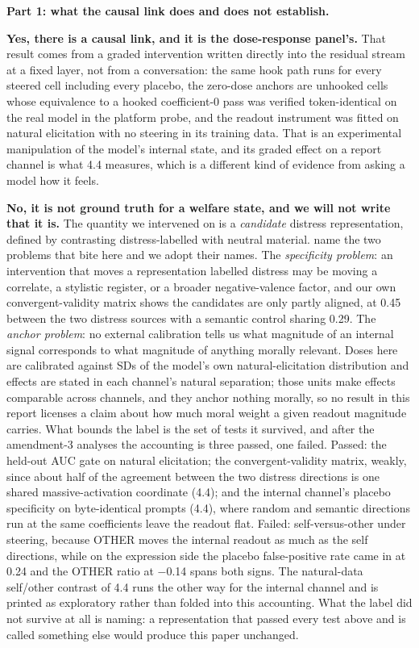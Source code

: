 \documentclass[11pt,a4paper]{article}
\newcommand{\pnum}[2]{#2}
\begin{document}
\textbf{Part 1: what the causal link does and does not establish.}

\textbf{Yes, there is a causal link, and it is the dose-response panel's.} That result comes from a graded intervention written directly into the residual stream at a fixed layer, not from a conversation: the same hook path runs for every steered cell including every placebo, the zero-dose anchors are unhooked cells whose equivalence to a hooked coefficient-0 pass was verified token-identical on the real model in the platform probe, and the readout instrument was fitted on natural elicitation with no steering in its training data. That is an experimental manipulation of the model's internal state, and its graded effect on a report channel is what 4.4 measures, which is a different kind of evidence from asking a model how it feels.

\textbf{No, it is not ground truth for a welfare state, and we will not write that it is.} The quantity we intervened on is a \emph{candidate} distress representation, defined by contrasting distress-labelled with neutral material. \citet{long2026studying} name the two problems that bite here and we adopt their names. The \emph{specificity problem}: an intervention that moves a representation labelled distress may be moving a correlate, a stylistic register, or a broader negative-valence factor, and our own convergent-validity matrix shows the candidates are only partly aligned, at \pnum{cosine\_matrix}{0.45} between the two distress sources with a semantic control sharing 0.29. The \emph{anchor problem}: no external calibration tells us what magnitude of an internal signal corresponds to what magnitude of anything morally relevant. Doses here are calibrated against SDs of the model's own natural-elicitation distribution and effects are stated in each channel's natural separation; those units make effects comparable across channels, and they anchor nothing morally, so no result in this report licenses a claim about how much moral weight a given readout magnitude carries. What bounds the label is the set of tests it survived, and after the amendment-3 analyses the accounting is three passed, one failed. Passed: the held-out AUC gate on natural elicitation; the convergent-validity matrix, weakly, since about half of the agreement between the two distress directions is one shared massive-activation coordinate (4.4); and the internal channel's placebo specificity on byte-identical prompts (4.4), where random and semantic directions run at the same coefficients leave the readout flat. Failed: self-versus-other under steering, because OTHER moves the internal readout as much as the self directions, while on the expression side the placebo false-positive rate came in at \pnum{panelA\_fpr\_placebo\_at\_threshold}{0.24} and the OTHER ratio at \pnum{panelA\_other\_vs\_self\_ratio}{$-$0.14} spans both signs. The natural-data self/other contrast of 4.4 runs the other way for the internal channel and is printed as exploratory rather than folded into this accounting. What the label did not survive at all is naming: a representation that passed every test above and is called something else would produce this paper unchanged.
\end{document}
